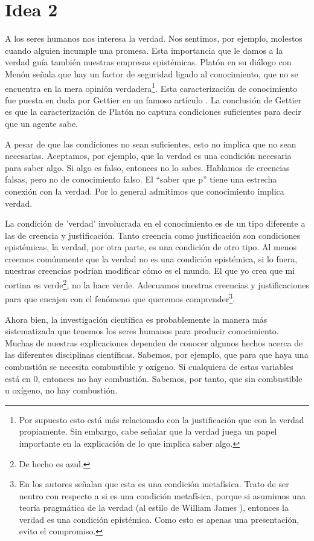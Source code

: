 \documentclass[12pt]{article}
\begin{document}
\section{Idea 2}

A los seres humanos nos interesa la verdad. Nos sentimos, por ejemplo, molestos cuando alguien incumple una promesa. Esta importancia que le damos a la verdad guía también nuestras empresas epistémicas. Platón en su diálogo con Menón \cite[\P\P 97a-98b]{platonmeno} señala que hay un factor de seguridad ligado al conocimiento, que no se encuentra en la mera opinión verdadera\footnote{Por supuesto esto está más relacionado con la justificación que con la verdad propiamente. Sin embargo, cabe señalar que la verdad juega un papel importante en la explicación de lo que implica saber algo.}. Esta caracterización de conocimiento fue puesta en duda por Gettier en un famoso artículo \citeyear{Gettier}. La conclusión de Gettier es que la caracterización de Platón no captura condiciones suficientes para decir que un agente sabe.

A pesar de que las condiciones no sean suficientes, esto no implica que no sean necesarias. Aceptamos, por ejemplo, que la verdad es una condición necesaria para saber algo. Si algo es falso, entonces no lo sabes. Hablamos de creencias falsas, pero no de conocimiento falso. El ``saber que p'' tiene una estrecha conexión con la verdad. Por lo general admitimos que conocimiento implica verdad.

La condición de 'verdad' involucrada en el conocimiento es de un tipo diferente a las de creencia y justificación. Tanto creencia como justificación son condiciones epistémicas, la verdad, por otra parte, es una condición de otro tipo. Al menos creemos comúnmente que la verdad no es una condición epistémica, si lo fuera, nuestras creencias podrían modificar cómo es el mundo. El que yo crea que mi cortina es verde\footnote{De hecho es azul.}, no la hace verde. Adecuamos nuestras creencias y justificaciones para que encajen con el fenómeno que queremos comprender\footnote{En \cite{sep-knowledge-analysis} los autores señalan que esta es una condición metafísica. Trato de ser neutro con respecto a si es una condición metafísica, porque si asumimos una teoría pragmática de la verdad (al estilo de William James ), entonces la verdad es una condición epistémica. Como esto es apenas una presentación, evito el compromiso.}.  

Ahora bien, la investigación científica es probablemente la manera más sistematizada que tenemos los seres humanos para producir conocimiento. Muchas de nuestras explicaciones dependen de conocer algunos hechos acerca de las diferentes disciplinas científicas. Sabemos, por ejemplo, que para que haya una combustión se necesita combustible y oxígeno. Si cualquiera de estas variables está en 0, entonces no hay combustión. Sabemos, por tanto, que sin combustible u oxígeno, no hay combustión.
\end{document}
